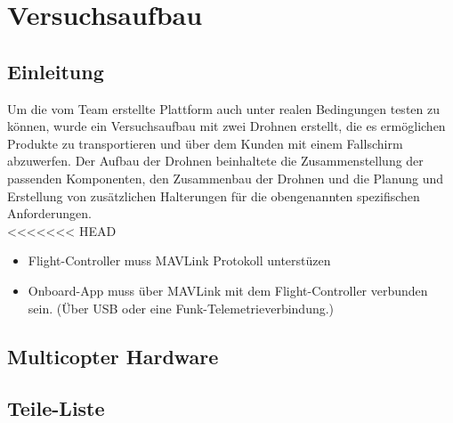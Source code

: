 \chapter{Versuchsaufbau}

\section{Einleitung}

Um die vom Team erstellte Plattform auch unter realen Bedingungen testen zu können, wurde ein Versuchsaufbau mit zwei Drohnen erstellt, die es ermöglichen Produkte zu transportieren und über dem Kunden mit einem Fallschirm abzuwerfen. Der Aufbau der Drohnen beinhaltete die Zusammenstellung der passenden Komponenten, den Zusammenbau der Drohnen und die Planung und Erstellung von zusätzlichen Halterungen für die obengenannten spezifischen Anforderungen.\\


<<<<<<< HEAD
\begin{itemize}

\item Flight-Controller muss \Gls{MAVLink} Protokoll unterstüzen
\item Onboard-App muss über MAVLink mit dem Flight-Controller verbunden sein. (Über USB oder eine Funk-Telemetrieverbindung.)
\end{itemize}

\section{Multicopter Hardware}

\section{Teile-Liste}

